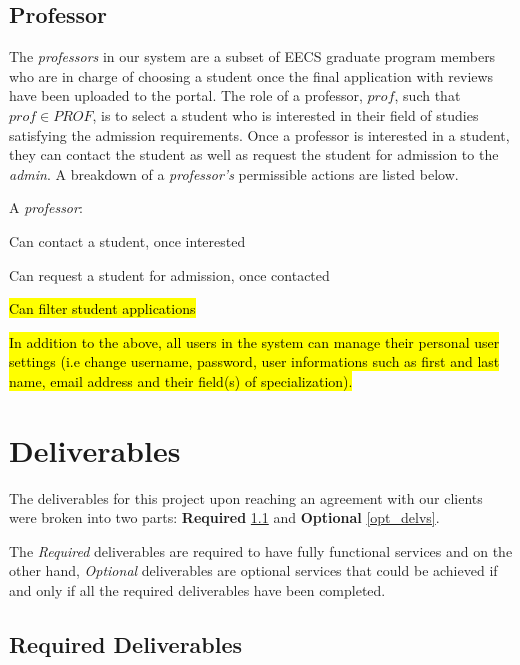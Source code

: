 \documentclass[fontsize=12pt,paper=letter,twoside]{scrartcl}
\begin{document}
\subsection{Professor}

The \emph{professors} in our system are a subset of EECS graduate program members who are in charge of choosing a student once the final application with reviews have been uploaded to the portal. The role of a professor, $prof$, such that $prof \in PROF$, is to select a student who is interested in their field of studies satisfying the admission requirements. Once a professor is interested in a student, they can contact the student as well as request the student for admission to the \emph{admin}. A breakdown of a \emph{professor's} permissible actions are listed below.

\smallskip
\noindent A \emph{professor}:

\begin{mylist}
\item Can contact a student, once interested
\item Can request a student for admission, once	contacted
\item \hl{Can filter student applications}
\end{mylist}

\bigskip
\noindent \hl{In addition to the above, all users in the system can manage their personal user settings (i.e change username, password, user informations such as first and last name, email address and their field(s) of specialization).}

\newpage
\section{Deliverables}

The deliverables for this project upon reaching an agreement with our clients were broken into two parts: \textbf{Required} \ref{req_delvs} and \textbf{Optional} \ref{opt_delvs}.

\smallskip

\noindent The \emph{Required} deliverables are required to have fully functional services and on the other hand, \emph{Optional} deliverables are optional services that could be achieved if and only if all the required deliverables have been completed.

\subsection{Required Deliverables} \label{req_delvs}
\end{document}
